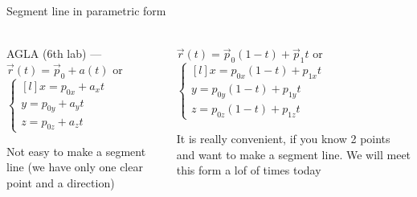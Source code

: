\documentclass[aspectratio=169]{beamer}
\begin{document}
\begin{frame}[t]{Segment line in parametric form}
\framesubtitle{}
    \begin{columns}[T,onlytextwidth]
        \begin{column}{0.49\textwidth}
            AGLA (6th lab) --- $\vec{r}(t)=\vec{p}_0+a(t)$ or \\ $\left\{\begin{matrix*}[l]
            x = p_{0x} + a_x t\\ 
            y = p_{0y} + a_y t\\
            z = p_{0z} + a_z t
            \end{matrix*}\right.$

        {Not easy to make a segment line (we have only one clear point and a direction)}
        \end{column}
        \begin{column}{0.49\textwidth}
            $\vec{r}(t)=\vec{p}_0(1-t)+\vec{p}_1 t$ or $\left\{\begin{matrix*}[l]
                x = p_{0x}(1-t) + p_{1x} t\\ 
                y = p_{0y}(1-t) + p_{1y} t\\
                z = p_{0z}(1-t) + p_{1z} t
                \end{matrix*}\right.$

                {It is really convenient, if you know 2 points and want to make a segment line. We will meet this form a lof of times today}
        \end{column}
    \end{columns}
\end{frame}
\end{document}
